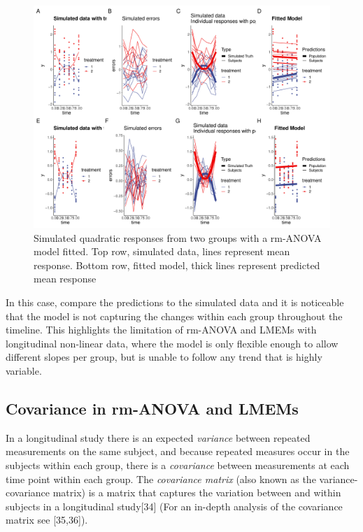 \documentclass[
]{article}
\begin{document}
\begin{figure}
\centering
\includegraphics{Manuscript_AM_v2_files/figure-latex/quadratic-response-1.pdf}
\caption{\label{fig:quadratic-response}Simulated quadratic responses from two groups with a rm-ANOVA model fitted. Top row, simulated data, lines represent mean response. Bottom row, fitted model, thick lines represent predicted mean response}
\end{figure}

In this case, compare the predictions to the simulated data and it is noticeable that the model is not capturing the changes within each group throughout the timeline. This highlights the limitation of rm-ANOVA and LMEMs with longitudinal non-linear data, where the model is only flexible enough to allow different slopes per group, but is unable to follow any trend that is highly variable.

\hypertarget{covariance-in-rm-anova-and-lmems}{%
\subsection{Covariance in rm-ANOVA and LMEMs}\label{covariance-in-rm-anova-and-lmems}}

In a longitudinal study there is an expected \emph{variance} between repeated measurements on the same subject, and because repeated measures occur in the subjects within each group, there is a \emph{covariance} between measurements at each time point within each group. The \emph{covariance matrix} (also known as the variance-covariance matrix) is a matrix that captures the variation between and within subjects in a longitudinal study{[}34{]} (For an in-depth analysis of the covariance matrix see {[}35,36{]}).
\end{document}
